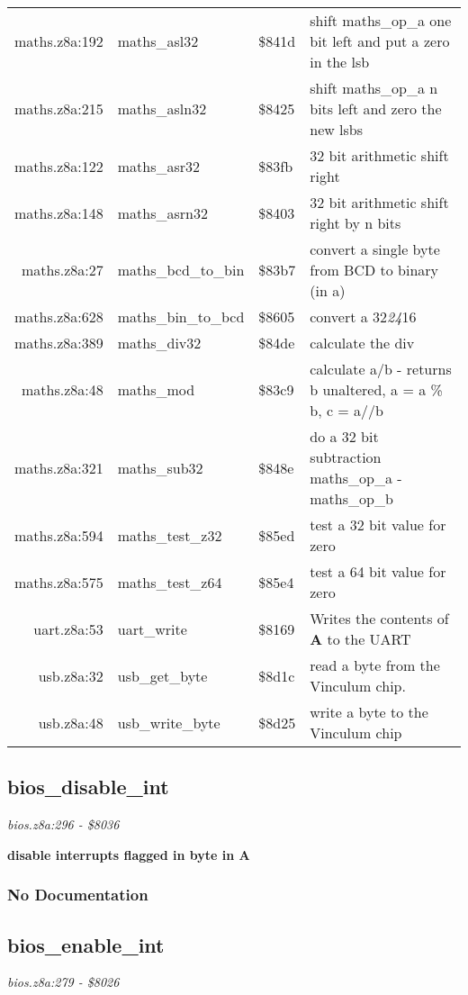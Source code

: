 \begin{tabular}{rllp{7cm}}
 maths.z8a:192&maths\_asl32&\$841d&shift maths\_op\_a one bit left and put a zero in the lsb\\
 maths.z8a:215&maths\_asln32&\$8425&shift maths\_op\_a n bits left and zero the new lsbs\\
 maths.z8a:122&maths\_asr32&\$83fb&32 bit arithmetic shift right\\
 maths.z8a:148&maths\_asrn32&\$8403&32 bit arithmetic shift right by n bits\\
 maths.z8a:27&maths\_bcd\_to\_bin&\$83b7&convert a single byte from BCD to binary (in a)\\
 maths.z8a:628&maths\_bin\_to\_bcd&\$8605&convert a 32\textit{24}16\\
 maths.z8a:389&maths\_div32&\$84de&calculate the div\\
 maths.z8a:48&maths\_mod&\$83c9&calculate a/b - returns b unaltered, a = a \% b, c = a//b\\
 maths.z8a:321&maths\_sub32&\$848e&do a 32 bit subtraction maths\_op\_a - maths\_op\_b\\
 maths.z8a:594&maths\_test\_z32&\$85ed&test a 32 bit value for zero\\
 maths.z8a:575&maths\_test\_z64&\$85e4&test a 64 bit value for zero\\
 uart.z8a:53&uart\_write&\$8169&Writes the contents of \textbf{A} to the UART\\
 usb.z8a:32&usb\_get\_byte&\$8d1c&read a byte from the Vinculum chip.\\
 usb.z8a:48&usb\_write\_byte&\$8d25&write a byte to the Vinculum chip\\
\end{tabular}

\subsection{bios\_disable\_int}
\textit{bios.z8a:296 - \$8036}

\noindent
\textbf{disable interrupts flagged in byte in A}

\subsubsection{No Documentation}


\subsection{bios\_enable\_int}
\textit{bios.z8a:279 - \$8026}


